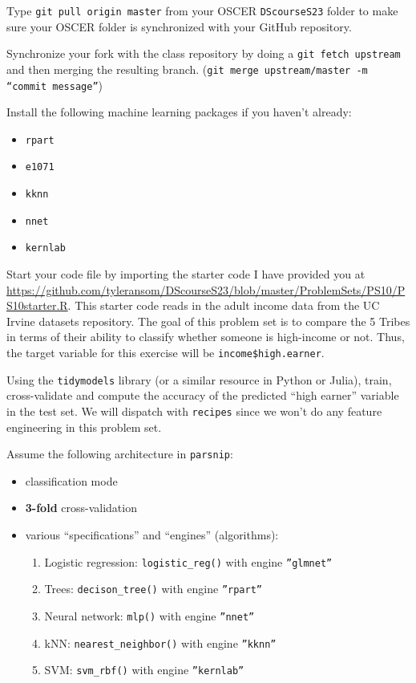 \documentclass[12pt,english]{exam}
\begin{document}
\begin{questions}
\question Type \texttt{git pull origin master} from your OSCER \texttt{DScourseS23} folder to make sure your OSCER folder is synchronized with your GitHub repository. 

\question Synchronize your fork with the class repository by doing a \texttt{git fetch upstream} and then merging the resulting branch. (\texttt{git merge upstream/master -m ``commit message''})

\question Install the following machine learning packages if you haven't already:
\begin{itemize}
    \item \texttt{rpart}
    \item \texttt{e1071}
    \item \texttt{kknn}
    \item \texttt{nnet}
    \item \texttt{kernlab}
\end{itemize}

\question Start your code file by importing the starter code I have provided you at \url{https://github.com/tyleransom/DScourseS23/blob/master/ProblemSets/PS10/PS10starter.R}. This starter code reads in the adult income data from the UC Irvine datasets repository. The goal of this problem set is to compare the 5 Tribes in terms of their ability to classify whether someone is high-income or not. Thus, the target variable for this exercise will be \texttt{income\$high.earner}. 

\question Using the \texttt{tidymodels} library (or a similar resource in Python or Julia), train, cross-validate and compute the accuracy of the predicted ``high earner'' variable in the test set. We will dispatch with \texttt{recipes} since we won't do any feature engineering in this problem set.

Assume the following architecture in \texttt{parsnip}:

\begin{itemize}
\item classification mode
\item \textbf{3-fold} cross-validation
\item various ``specifications'' and ``engines'' (algorithms):
    \begin{enumerate}
    \item Logistic regression: \texttt{logistic\_reg()} with engine \texttt{''glmnet''}    
    \item Trees: \texttt{decison\_tree()} with engine \texttt{''rpart''}
    \item Neural network: \texttt{mlp()} with engine \texttt{''nnet''}      
    \item kNN: \texttt{nearest\_neighbor()} with engine \texttt{''kknn''}       
    \item SVM: \texttt{svm\_rbf()} with engine \texttt{''kernlab''}       
    \end{enumerate}
\end{itemize}


\end{questions}
\end{document}
